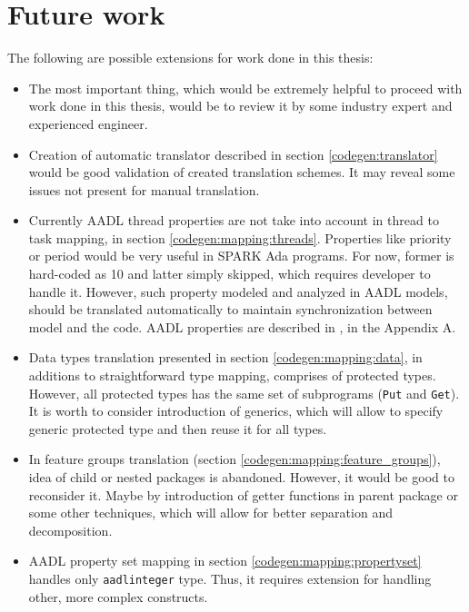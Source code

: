 
\cleardoublepage

\chapter{Future work}
\label{future_work}

The following are possible extensions for work done in this thesis:

\begin{itemize}
	\item The most important thing, which would be extremely helpful to proceed with work done in this thesis, would be to review it by some industry expert and experienced engineer.
	\item Creation of automatic translator described in section \ref{codegen:translator} would be good validation of created translation schemes. It may reveal some issues not present for manual translation.
	\item Currently AADL thread properties are not take into account in thread to task mapping, in section \ref{codegen:mapping:threads}. Properties like priority or period would be very useful in SPARK Ada programs. For now, former is hard-coded as 10 and latter simply skipped, which requires developer to handle it. However, such property modeled and analyzed in AADL models, should be translated automatically to maintain synchronization between model and the code. AADL properties are described in \cite{AadlBook}, in the Appendix A.
	\item Data types translation presented in section \ref{codegen:mapping:data}, in additions to straightforward type mapping, comprises of protected types. However, all protected types has the same set of subprograms (\lstinline{Put} and \lstinline{Get}). It is worth to consider introduction of generics, which will allow to specify generic protected type and then reuse it for all types.
	\item In feature groups translation (section \ref{codegen:mapping:feature_groups}), idea of child or nested packages is abandoned. However, it would be good to reconsider it. Maybe by introduction of getter functions in parent package or some other techniques, which will allow for better separation and decomposition.
	\item AADL property set mapping in section \ref{codegen:mapping:propertyset} handles only \lstinline{aadlinteger} type. Thus, it requires extension for handling other, more complex constructs.

\end{itemize}
